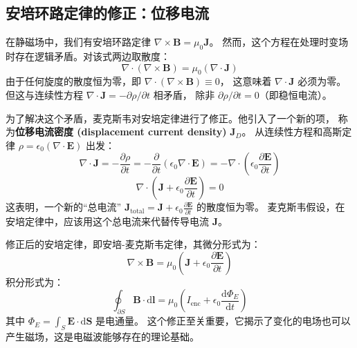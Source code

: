\documentclass[fontset=none]{ctexart}
\begin{document}
\subsection{安培环路定律的修正：位移电流}
在静磁场中，我们有安培环路定律 $\nabla \times \bm{B} = \mu_0 \bm{J}$。
然而，这个方程在处理时变场时存在逻辑矛盾。对该式两边取散度：
\begin{equation}
    \nabla \cdot (\nabla \times \bm{B}) = \mu_0 (\nabla \cdot \bm{J})
\end{equation}
由于任何旋度的散度恒为零，即 $\nabla \cdot (\nabla \times \bm{B}) \equiv 0$，
这意味着 $\nabla \cdot \bm{J}$ 必须为零。但这与连续性方程 
$\nabla \cdot \bm{J} = -\partial\rho/\partial t$ 相矛盾，
除非 $\partial\rho/\partial t = 0$（即稳恒电流）。

为了解决这个矛盾，麦克斯韦对安培定律进行了修正。他引入了一个新的项，
称为\textbf{位移电流密度 (displacement current density)} $\bm{J}_D$。
从连续性方程和高斯定律 $\rho = \epsilon_0 (\nabla \cdot \bm{E})$ 出发：
\begin{equation}
    \nabla \cdot \bm{J} = -\frac{\partial\rho}{\partial t} 
    = -\frac{\partial}{\partial t} (\epsilon_0 \nabla \cdot \bm{E}) 
    = -\nabla \cdot \left(\epsilon_0 \frac{\partial \bm{E}}{\partial t}\right)
\end{equation}
\begin{equation}
    \nabla \cdot \left(\bm{J} + \epsilon_0 \frac{\partial \bm{E}}{\partial t}\right) = 0
\end{equation}
这表明，一个新的“总电流” $\bm{J}_{\text{total}} 
= \bm{J} + \epsilon_0 \frac{\partial \bm{E}}{\partial t}$ 的散度恒为零。
麦克斯韦假设，在安培定律中，应该用这个总电流来代替传导电流 $\bm{J}$。
\begin{law}[安培-麦克斯韦定律]
    修正后的安培定律，即安培-麦克斯韦定律，其微分形式为：
    \begin{equation}
        \nabla \times \bm{B} 
        = \mu_0 \left(\bm{J} + \epsilon_0 \frac{\partial \bm{E}}{\partial t}\right)
    \end{equation}
    积分形式为：
    \begin{equation}
        \oint_{\partial S} \bm{B} \cdot \mathrm{d}\bm{l} 
        = \mu_0 \left(I_{\text{enc}} + \epsilon_0 \frac{\mathrm{d}\Phi_E}{\mathrm{d}t}\right)
    \end{equation}
    其中 $\Phi_E = \int_S \bm{E} \cdot \mathrm{d}\bm{S}$ 是电通量。
    这个修正至关重要，它揭示了变化的电场也可以产生磁场，这是电磁波能够存在的理论基础。
\end{law}
\end{document}
